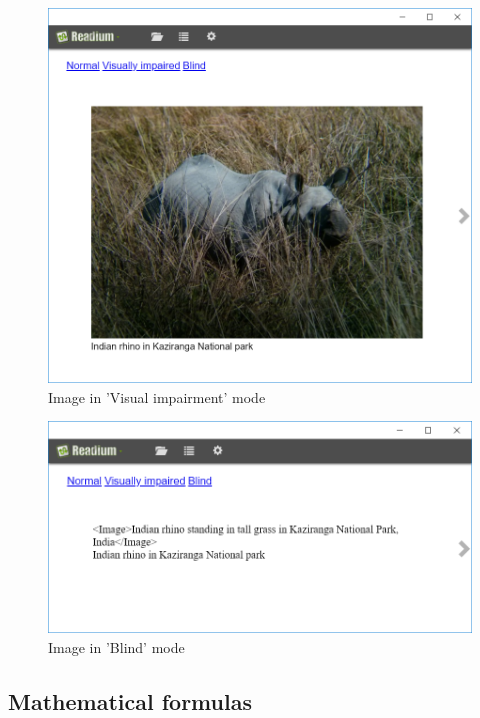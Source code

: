 \begin{figure}[H]
	\centering
	\includegraphics[width=\linewidth]{figures/ImageVi.PNG}
	\caption{Image in 'Visual impairment' mode}
	\label{fig:image_viimp}
\end{figure}

\begin{figure}[H]
	\centering
	\includegraphics[width=\linewidth]{figures/ImageBl.PNG}
	\caption{Image in 'Blind' mode}
	\label{fig:image_blind}
\end{figure}






\subsection{Mathematical formulas}

